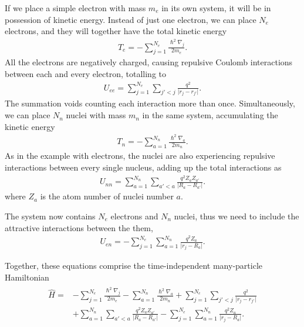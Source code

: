 If we place a simple electron with mass $m_e$ in its own system, it will be in  possession of kinetic energy. Instead of just one electron, we can place $N_e$ electrons, and they will together have the total kinetic energy
\begin{align}
  T_e = - \sum_{j=1}^{N_e} \frac{\hslash^2\nabla_j}{2m_e}.
\end{align}
All the electrons are negatively charged, causing repulsive Coulomb interactions between each and every electron, totalling to
\begin{align}
  U_{ee} = \sum_{j=1}^{N_e}\sum_{j'<j} \frac{q^2}{\lvert r_j - r_{j'}\rvert}.
  \label{eq:electron-electron}
\end{align}
The summation voids counting each interaction more than once. Simultaneously, we can place $N_n$ nuclei with mass $m_n$ in the same system, accumulating the kinetic energy
\begin{align}
  T_n = - \sum_{a=1}^{N_n} \frac{\hslash^2\nabla_a}{2m_n}.
\end{align}
As in the example with electrons, the nuclei are also experiencing repulsive interactions between every single nucleus, adding up the total interactions as
\begin{align}
  U_{nn} = \sum_{a=1}^{N_n}\sum_{a'<a} \frac{q^2 Z_aZ_{a'}}{\lvert R_a - R_{a'}\rvert }.
\end{align}
where $Z_a$ is the atom number of nuclei number $a$.

The system now contains $N_e$ electrons and $N_n$ nuclei, thus we need to include the attractive interactions between the them,
\begin{align}
  U_{en} = - \sum_{j=1}^{N_e} \sum_{a=1}^{N_n} \frac{q^2Z_a}{\lvert r_j-R_a\rvert}.
\end{align}

Together, these equations comprise the time-independent many-particle Hamiltonian
\begin{align}
  \begin{aligned}
    \hat{H} = &- \sum_{j=1}^{N_e} \frac{\hslash^2\nabla_j}{2m_e} - \sum_{a=1}^{N_n} \frac{\hslash^2\nabla_a}{2m_n} + \sum_{j=1}^{N_e}\sum_{j'<j} \frac{q^2}{\lvert r_j - r_{j'}\rvert} \\ &+\sum_{a=1}^{N_n}\sum_{a'<a} \frac{q^2 Z_aZ_{a'}}{\lvert R_a - R_{a'}\rvert } - \sum_{j=1}^{N_e} \sum_{a=1}^{N_n} \frac{q^2Z_a}{\lvert r_j-R_a\rvert}.
  \end{aligned}
\end{align}


